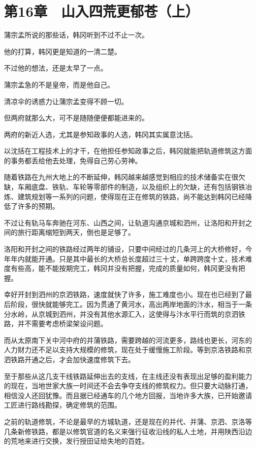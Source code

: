\section{第16章　山入四荒更郁苍（上）}

蒲宗孟所说的那些话，韩冈听到不过不止一次。

他的打算，韩冈更是知道的一清二楚。

不过他的想法，还是太早了一点。

蒲宗孟急的不是皇帝，而是他自己。

清凉伞的诱惑力让蒲宗孟变得不顾一切。

但两府就那么大，可不是随随便便都能进来的。

两府的新近人选，尤其是参知政事的人选，韩冈其实属意沈括。

以沈括在工程技术上的才干，在他担任参知政事之后，韩冈就能把轨道修筑这方面的事务都丢给他去处理，免得自己劳心劳神。

随着铁路在九州大地上的不断延伸，韩冈越来越感觉到相应的技术储备实在很欠缺，车厢底盘、铁轨、车轮等零部件的制造，以及组织上的欠缺，还有包括钢铁冶炼、建筑规划等一系列的问题，使得现在正在修筑的铁路，尚不能达到韩冈已经降低了许多的预期。

不过让有轨马车奔驰在河东、山西之间，让轨道沟通京城和泗州，让洛阳和开封之间的旅行距离缩短到两天，倒也是足够了。

洛阳和开封之间的铁路经过两年的铺设，只要中间经过的几条河上的大桥修好，今年年内就能开通。只是其中最长的大桥总长度超过三十丈，单跨跨度十丈，技术难度有些高，能不能按期完工，韩冈并没有把握，完成的质量如何，韩冈更没有把握。

幸好开封到泗州的京泗铁路，速度就快了许多，施工难度也小。现在也已经到了最后阶段，很快就能够完工。因为贯通了黄河水，高出两岸地面的汴水，相当于一条分水岭，从京城到泗州，并没有其他水源汇入，这使得与汴水平行而筑的京泗铁路，并不需要考虑桥梁架设问题。

而从太原南下关中河中府的并蒲铁路，需要跨越的河流更多，路线也更长，河东的人力财力还不足以支持大规模的修筑，现在处于缓慢施工阶段。等到京洛铁路和京泗铁路开通之后，才会加快速度修筑下去。

至于那些从这几支干线铁路延伸出去的支线，在主线还没有表现出足够的盈利能力的现在，当地世家大族一时间还不会去争夺支线的修筑权力。但只要大动脉打通，相信没人还回犹豫。而且据已经通车的几个地方回报，当地许多大族，已开始邀请工匠进行路线勘探，确定修筑的范围。

之前的轨道修筑，不论是最早的方城轨道，还是现在的并代、并蒲、京泗、京洛等几条新修铁路，都是以修筑官道的名义来强行征收沿线的私人土地，并用陕西沿边的荒地来进行交换，发行授田证给失地的百姓。

